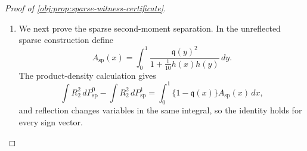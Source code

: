 \begin{proof}[Proof of \cref{obj:prop:sparse-witness-certificate}]
\begin{enumerate}
For the cancellation law, put
\[
\bar\kappa=\int_0^1\kappa_1(x)\,dx,
\qquad
\overline{\kappa^2}=\int_0^1\kappa_1(x)^2\,dx.
\]
The function \(\kappa_1\) is continuous and nonconstant: indeed \(H(0)=H(1)=0\), while
\[
H(1/2)=\frac{\exp(2)-1}{\exp(4)-1}-\frac12
=\frac1{\exp(2)+1}-\frac12<0.
\]
Therefore
\[
0<\int_0^1\{\kappa_1(x)-\bar\kappa\}^2\,dx
=\overline{\kappa^2}-\bar\kappa^2.
\]
The cancellation child density is \(1+\frac1{10}\kappa_1(x)\chi_2(y)\), and the same centered-coordinate calculation gives
\[
\int \kappa_1(v_1)\,dP^0_{\mathrm{can}}(v)=\bar\kappa,
\qquad
\int \chi_2(v_2)\,dP^0_{\mathrm{can}}(v)=\frac1{30}\bar\kappa,
\]
\[
\int \kappa_1(v_1)\chi_2(v_2)\,dP^0_{\mathrm{can}}(v)=\frac1{30}\overline{\kappa^2}.
\]
Independence of the first two coordinates under \(P^0_{\mathrm{can}}\) would force
\[
\frac1{30}\overline{\kappa^2}
=
\bar\kappa\cdot\frac1{30}\bar\kappa,
\]
contradicting \(\overline{\kappa^2}-\bar\kappa^2>0\).  Hence the edge endpoints are also dependent in the cancellation observational law.  Finally, the factorization over \(1\to2\) with node \(3\) isolated gives the local-Markov independence of nodes \(1\) and \(3\).  In this three-node graph, any failed d-separation between disjoint coordinate blocks places the endpoints of the unique edge in opposite blocks; if the conditioning block contains node \(3\), contraction with the independence of nodes \(1\) and \(3\) reduces it to the unconditional edge independence just ruled out.  Both observational laws are therefore faithful to the three-node DAG, giving \cref{obj:ass:faithfulness}. %

\item We next prove the sparse second-moment separation.  In the unreflected sparse construction define
\[
A_{\mathrm{sp}}(x)
=
\int_0^1
\frac{\mathfrak q(y)^2}{1+\frac1{10}h(x)h(y)}\,dy .
\]
The product-density calculation gives
\[
\int R_2^2\,dP^0_{\mathrm{sp}}
-
\int R_2^2\,dP^1_{\mathrm{sp}}
=
\int_0^1 \{1-\mathfrak q(x)\}A_{\mathrm{sp}}(x)\,dx,
\]
and reflection changes variables in the same integral, so the identity holds for every sign vector.


\end{enumerate}
\end{proof}
